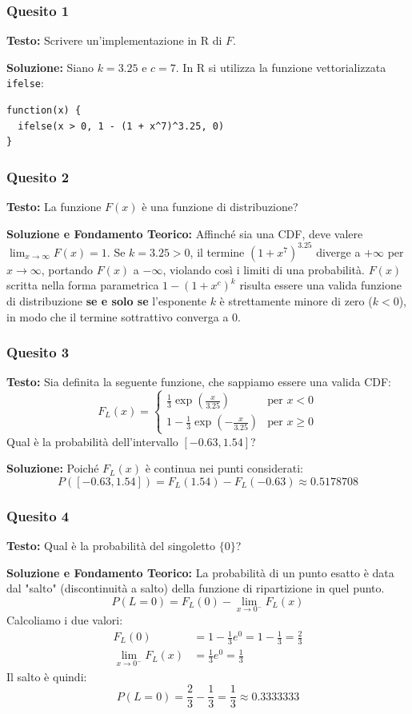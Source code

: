 \documentclass[12pt, a4paper]{article}
\begin{document}
\subsubsection*{Quesito 1}
\textbf{Testo:} Scrivere un'implementazione in R di $F$.

\textbf{Soluzione:}
Siano $k=3.25$ e $c=7$. In R si utilizza la funzione vettorializzata \texttt{ifelse}:
\begin{verbatim}
function(x) {
  ifelse(x > 0, 1 - (1 + x^7)^3.25, 0)
}
\end{verbatim}

\subsubsection*{Quesito 2}
\textbf{Testo:} La funzione $F(x)$ è una funzione di distribuzione?

\textbf{Soluzione e Fondamento Teorico:}
Affinché sia una CDF, deve valere $\lim_{x \to \infty} F(x) = 1$. 
Se $k = 3.25 > 0$, il termine $(1+x^7)^{3.25}$ diverge a $+\infty$ per $x \to \infty$, portando $F(x)$ a $-\infty$, violando così i limiti di una probabilità.
$F(x)$ scritta nella forma parametrica $1 - (1+x^c)^k$ risulta essere una valida funzione di distribuzione \textbf{se e solo se} l'esponente $k$ è strettamente minore di zero ($k < 0$), in modo che il termine sottrattivo converga a 0.

\subsubsection*{Quesito 3}
\textbf{Testo:} Sia definita la seguente funzione, che sappiamo essere una valida CDF:
$$
F_L(x) = 
\begin{cases} 
\frac{1}{3} \exp\left(\frac{x}{3.25}\right) & \text{per } x < 0 \\
1 - \frac{1}{3} \exp\left(-\frac{x}{3.25}\right) & \text{per } x \ge 0
\end{cases}
$$
Qual è la probabilità dell'intervallo $[-0.63, 1.54]$?

\textbf{Soluzione:}
Poiché $F_L(x)$ è continua nei punti considerati:
$$P([-0.63, 1.54]) = F_L(1.54) - F_L(-0.63) \approx 0.5178708$$

\subsubsection*{Quesito 4}
\textbf{Testo:} Qual è la probabilità del singoletto $\{0\}$?

\textbf{Soluzione e Fondamento Teorico:}
La probabilità di un punto esatto è data dal "salto" (discontinuità a salto) della funzione di ripartizione in quel punto.
$$P(L=0) = F_L(0) - \lim_{x \to 0^-} F_L(x)$$
Calcoliamo i due valori:
\begin{align*}
F_L(0) &= 1 - \frac{1}{3} e^0 = 1 - \frac{1}{3} = \frac{2}{3} \\
\lim_{x \to 0^-} F_L(x) &= \frac{1}{3} e^0 = \frac{1}{3}
\end{align*}
Il salto è quindi:
$$P(L=0) = \frac{2}{3} - \frac{1}{3} = \frac{1}{3} \approx 0.3333333$$
\end{document}
